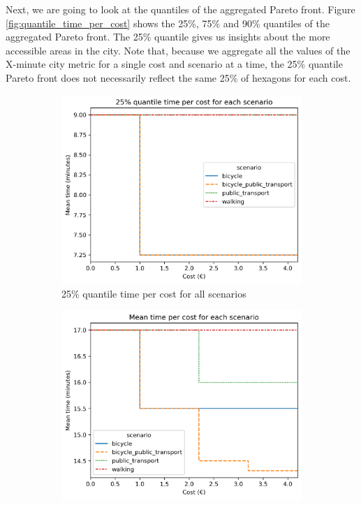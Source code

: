 Next, we are going to look at the quantiles of the aggregated Pareto front.
Figure \ref{fig:quantile_time_per_cost} shows the 25\%, 75\% and 90\% quantiles of the aggregated Pareto front.
The 25\% quantile gives us insights about the more accessible areas in the city.
Note that, because we aggregate all the values of the X-minute city metric for a single cost and scenario at a time, the 25\% quantile Pareto front does not necessarily reflect the same 25\% of hexagons for each cost.

\begin{figure}
     \centering
     \begin{subfigure}[b]{0.48\textwidth}
         \centering
         \includegraphics[width=\textwidth]{Figures/results/metric_cost/quantile_25_time_per_cost_for_each_scenario_without_car.png}
         \caption{25\% quantile time per cost for all scenarios}
         \label{fig:25_quantile_time_per_cost}
     \end{subfigure}
     \hfill
     \begin{subfigure}[b]{0.48\textwidth}
         \centering
         \includegraphics[width=\textwidth]{Figures/results/metric_cost/quantile_75_time_per_cost_for_each_scenario_without_car.png}

\end{subfigure}
\end{figure}
